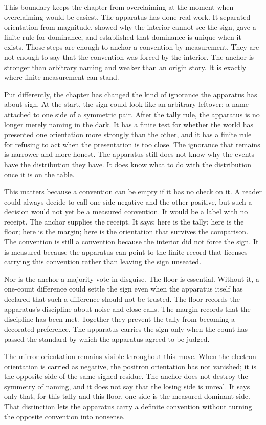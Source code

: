 This boundary keeps the chapter from overclaiming at the moment when
overclaiming would be easiest. The apparatus has done real work. It separated
orientation from magnitude, showed why the interior cannot see the sign, gave a
finite rule for dominance, and established that dominance is unique when it exists.
Those steps are enough to anchor a convention by measurement. They are not
enough to say that the convention was forced by the interior. The anchor is
stronger than arbitrary naming and weaker than an origin story. It is exactly
where finite measurement can stand.

Put differently, the chapter has changed the kind of ignorance the apparatus
has about sign. At the start, the sign could look like an arbitrary leftover: a
name attached to one side of a symmetric pair. After the tally rule, the
apparatus is no longer merely naming in the dark. It has a finite test for
whether the world has presented one orientation more strongly than the other,
and it has a finite rule for refusing to act when the presentation is too close.
The ignorance that remains is narrower and more honest. The apparatus still
does not know why the events have the distribution they have. It does know what
to do with the distribution once it is on the table.

This matters because a convention can be empty if it has no check on it. A
reader could always decide to call one side negative and the other positive,
but such a decision would not yet be a measured convention. It would be a label
with no receipt. The anchor supplies the receipt. It says: here is the tally;
here is the floor; here is the margin; here is the orientation that survives
the comparison. The convention is still a convention because the interior did
not force the sign. It is measured because the apparatus can point to the finite
record that licenses carrying this convention rather than leaving the sign
unseated.

Nor is the anchor a majority vote in disguise. The floor is essential. Without
it, a one-count difference could settle the sign even when the apparatus itself
has declared that such a difference should not be trusted. The floor records
the apparatus's discipline about noise and close calls. The margin records that
the discipline has been met. Together they prevent the tally from becoming a
decorated preference. The apparatus carries the sign only when the count has
passed the standard by which the apparatus agreed to be judged.

The mirror orientation remains visible throughout this move. When the electron
orientation is carried as negative, the positron orientation has not vanished;
it is the opposite side of the same signed residue. The anchor does not destroy
the symmetry of naming, and it does not say that the losing side is unreal. It
says only that, for this tally and this floor, one side is the measured
dominant side. That distinction lets the apparatus carry a definite convention
without turning the opposite convention into nonsense.

